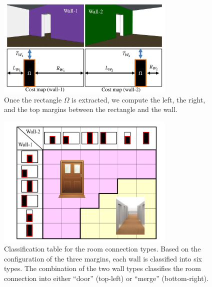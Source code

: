 \begin{figure}[!t]
	\begin{center}
		\includegraphics[width=85mm]{../figures/wallprofile.pdf}
	\end{center}
	\vspace{-0.2cm}
	\caption{Once the rectangle $\Omega$ is extracted, we compute
 the left, the right, and the top margins between the rectangle and the
 wall.}
	\label{fig:wallprofile}
	\vspace{-0.25cm}
\end{figure}
\begin{figure}[!t]
	\begin{center}
         \includegraphics[width=85mm]{../figures/dooranalysis.pdf}
	\end{center}
	\vspace{-0.2cm}
 \caption{Classification table for the room connection types.
 Based on the configuration of the three margins, each wall is
 classified into six types. The combination of the two wall types
 classifies the room connection into either ``door'' (top-left) or
 ``merge'' (bottom-right).
 } \label{fig:dooranalysis}
	\vspace{-0.25cm}
\end{figure}
